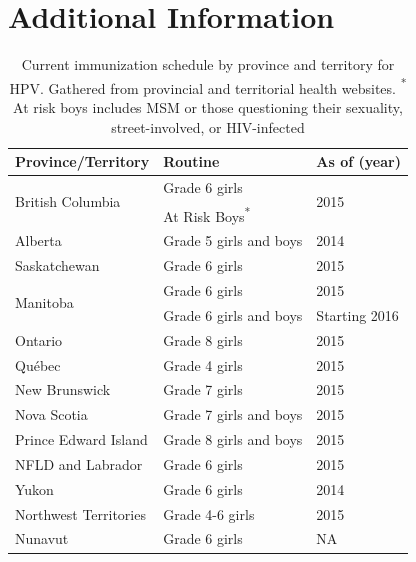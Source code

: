 \documentclass[12pt]{article}
\begin{document}
\section*{Additional Information}
\begin{table}[h!]
\begin{center}
\begin{tabular}{l | l | l }
Province/Territory & Routine &  As of (year)\\
\hline
\hline
\multirow{2}{*}{British Columbia} & Grade 6 girls & \multirow{2}{*}{2015}\\
& At Risk Boys\textsuperscript{*} & \\
\hline
Alberta & Grade 5 girls and boys & 2014\\
\hline
Saskatchewan & Grade 6 girls & 2015\\
\hline
\multirow{2}{*}{Manitoba} & Grade 6 girls & 2015\\
& Grade 6 girls and boys & Starting 2016\\
\hline 
Ontario & Grade 8 girls & 2015\\
\hline
Qu\'{e}bec & Grade 4 girls & 2015\\
\hline 
New Brunswick & Grade 7 girls & 2015 \\
\hline 
Nova Scotia & Grade 7 girls and boys & 2015\\
\hline
Prince Edward Island & Grade 8 girls and boys & 2015\\
\hline
NFLD and Labrador & Grade 6 girls & 2015\\
\hline
Yukon & Grade 6 girls & 2014\\
\hline
Northwest Territories & Grade 4-6 girls & 2015\\
\hline 
Nunavut & Grade 6 girls & NA\\
\hline
\end{tabular}

\caption{Current immunization schedule by province and territory for HPV.  Gathered from provincial and territorial health websites.  \newline
{\footnotesize \textsuperscript{*} At risk boys includes MSM or those questioning their sexuality, street-involved, or HIV-infected}}
\label{tab:ImmuneSched}
\end{center}
\end{table}
\end{document}
